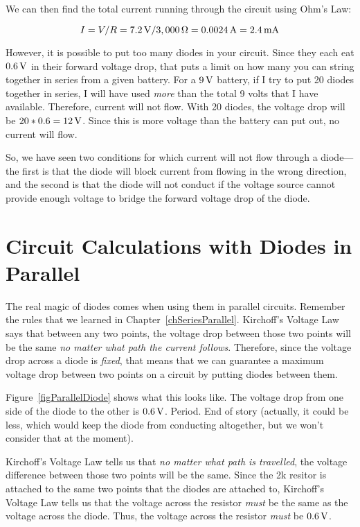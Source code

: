 We can then find the total current running through the circuit using Ohm's Law:

$$ I = V / R = 7.2\,\si{\volt} / 3,000\,\si{\ohm} = 0.0024\,\si{\ampere} = 2.4\,\si{\milli\ampere}$$


However, it is possible to put too many diodes in your circuit.
Since they each eat $0.6\,\si{\volt}$ in their forward voltage drop, that puts a limit on how many you can string together in series from a given battery.
For a $9\,\si{\volt}$ battery, if I try to put 20 diodes together in series, I will have used \emph{more} than the total 9 volts that I have available.  
Therefore, current will not flow.
With 20 diodes, the voltage drop will be $20 * 0.6 = 12\,\si{\volt}$.  
Since this is more voltage than the battery can put out, no current will flow.

So, we have seen two conditions for which current will not flow through a diode---the first is that the diode will block current from flowing in the wrong direction, and the second is that the diode will not conduct if the voltage source cannot provide enough voltage to bridge the forward voltage drop of the diode.

\section{Circuit Calculations with Diodes in Parallel}

The real magic of diodes comes when using them in parallel circuits.
Remember the rules that we learned in Chapter~\ref{chSeriesParallel}.
Kirchoff's Voltage Law says that between any two points, the voltage drop between those two points will be the same \emph{no matter what path the current follows}.
Therefore, since the voltage drop across a diode is \emph{fixed}, that means that we can guarantee a maximum voltage drop between two points on a circuit by putting diodes between them.


Figure~\ref{figParallelDiode} shows what this looks like.  
The voltage drop from one side of the diode to the other is $0.6\,\si{\volt}$.
Period. End of story (actually, it could be less, which would keep the diode from conducting altogether, but we won't consider that at the moment).

Kirchoff's Voltage Law tells us that \emph{no matter what path is travelled}, the voltage difference between those two points will be the same.
Since the 2k resitor is attached to the same two points that the diodes are attached to, Kirchoff's Voltage Law tells us that the voltage across the resistor \emph{must} be the same as the voltage across the diode.
Thus, the voltage across the resistor \emph{must} be $0.6\,\si{\volt}$.

